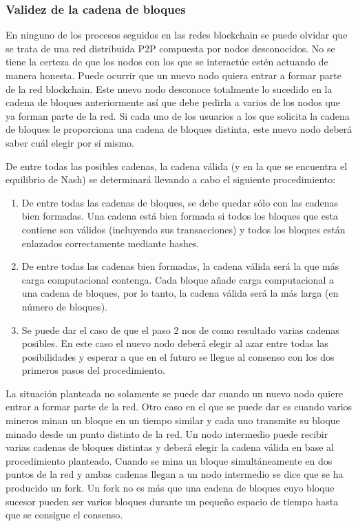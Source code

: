 \subsubsection{Validez de la cadena de bloques}
En ninguno de los procesos seguidos en las redes blockchain se puede olvidar que se trata de una red distribuida P2P compuesta por nodos desconocidos. No se tiene la certeza de que los nodos con los que se interactúe estén actuando de manera honesta. Puede ocurrir que un nuevo nodo quiera entrar a formar parte de la red blockchain. Este nuevo nodo desconoce totalmente lo sucedido en la cadena de bloques anteriormente así que debe pedirla a varios de los nodos que ya forman parte de la red. Si cada uno de los usuarios a los que solicita la cadena de bloques le proporciona una cadena de bloques distinta, este nuevo nodo deberá saber cuál elegir por sí mismo. \newline

De entre todas las posibles cadenas, la cadena válida (y en la que se encuentra el equilibrio de Nash) se determinará llevando a cabo el siguiente procedimiento:

\begin{enumerate}
	\item De entre todas las cadenas de bloques, se debe quedar sólo con las cadenas bien formadas. Una cadena está bien formada si todos los bloques que esta contiene son válidos (incluyendo sus transacciones) y todos los bloques están enlazados correctamente mediante hashes.
	\item De entre todas las cadenas bien formadas, la cadena válida será la que más carga computacional contenga. Cada bloque añade carga computacional a una cadena de bloques, por lo tanto, la cadena válida será la más larga (en número de bloques).
	\item Se puede dar el caso de que el paso 2 nos de como resultado varias cadenas posibles. En este caso el nuevo nodo deberá elegir al azar entre todas las posibilidades y esperar a que en el futuro se llegue al consenso con los dos primeros pasos del procedimiento.
\end{enumerate}

La situación planteada no solamente se puede dar cuando un nuevo nodo quiere entrar a formar parte de la red. Otro caso en el que se puede dar es cuando varios mineros minan un bloque en un tiempo similar y cada uno transmite su bloque minado desde un punto distinto de la red. Un nodo intermedio puede recibir varias cadenas de bloques distintas y deberá elegir la cadena válida en base al procedimiento planteado. Cuando se mina un bloque simultáneamente en dos puntos de la red y ambas cadenas llegan a un nodo intermedio se dice que se ha producido un fork. Un fork no es más que una cadena de bloques cuyo bloque sucesor pueden ser varios bloques durante un pequeño espacio de tiempo hasta que se consigue el consenso.

